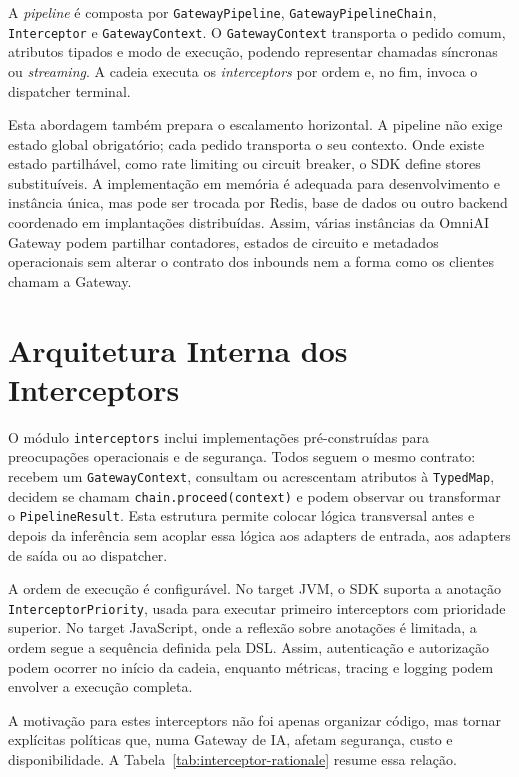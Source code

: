 \documentclass[11pt,a4paper]{report}
\begin{document}
    A \textit{pipeline} é composta por \texttt{GatewayPipeline}, \texttt{GatewayPipelineChain}, \texttt{Interceptor} e \texttt{GatewayContext}. O \texttt{GatewayContext} transporta o pedido comum, atributos tipados e modo de execução, podendo representar chamadas síncronas ou \textit{streaming}. A cadeia executa os \textit{interceptors} por ordem e, no fim, invoca o dispatcher terminal.

    Esta abordagem também prepara o escalamento horizontal. A pipeline não exige estado global obrigatório; cada pedido transporta o seu contexto. Onde existe estado partilhável, como rate limiting ou circuit breaker, o SDK define stores substituíveis. A implementação em memória é adequada para desenvolvimento e instância única, mas pode ser trocada por Redis, base de dados ou outro backend coordenado em implantações distribuídas. Assim, várias instâncias da OmniAI Gateway podem partilhar contadores, estados de circuito e metadados operacionais sem alterar o contrato dos inbounds nem a forma como os clientes chamam a Gateway.

    \section{Arquitetura Interna dos Interceptors}
    O módulo \texttt{interceptors} inclui implementações pré-construídas para preocupações operacionais e de segurança. Todos seguem o mesmo contrato: recebem um \texttt{GatewayContext}, consultam ou acrescentam atributos à \texttt{TypedMap}, decidem se chamam \texttt{chain.proceed(context)} e podem observar ou transformar o \texttt{PipelineResult}. Esta estrutura permite colocar lógica transversal antes e depois da inferência sem acoplar essa lógica aos adapters de entrada, aos adapters de saída ou ao dispatcher.

    A ordem de execução é configurável. No target JVM, o SDK suporta a anotação \texttt{InterceptorPriority}, usada para executar primeiro interceptors com prioridade superior. No target JavaScript, onde a reflexão sobre anotações é limitada, a ordem segue a sequência definida pela DSL. Assim, autenticação e autorização podem ocorrer no início da cadeia, enquanto métricas, tracing e logging podem envolver a execução completa.

    A motivação para estes interceptors não foi apenas organizar código, mas tornar explícitas políticas que, numa Gateway de IA, afetam segurança, custo e disponibilidade. A Tabela~\ref{tab:interceptor-rationale} resume essa relação.
\end{document}
